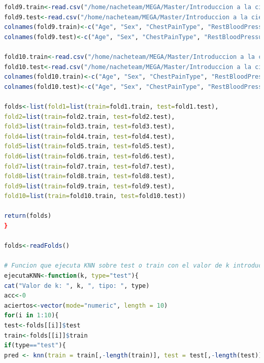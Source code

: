 \documentclass[12pt,a4paper]{article}
\begin{document}
\begin{lstlisting}[basicstyle=\tiny, language=R]
fold9.train<-read.csv("/home/nacheteam/MEGA/Master/Introduccion a la ciencia de datos/Trabajo Integrador/DATOS/Datasets Clasificacion/heart/heart-10-9tra.dat", header=FALSE, comment.char = "@")
fold9.test<-read.csv("/home/nacheteam/MEGA/Master/Introduccion a la ciencia de datos/Trabajo Integrador/DATOS/Datasets Clasificacion/heart/heart-10-9tst.dat", header=FALSE, comment.char = "@")
colnames(fold9.train)<-c("Age", "Sex", "ChestPainType", "RestBloodPressure", "SerumCholestoral", "FastingBloodSugar", "ResElectrocardiographic", "MaxHeartRate", "ExerciseInduced", "Oldpeak", "Slope", "MajorVessels", "Thal", "Class")
colnames(fold9.test)<-c("Age", "Sex", "ChestPainType", "RestBloodPressure", "SerumCholestoral", "FastingBloodSugar", "ResElectrocardiographic", "MaxHeartRate", "ExerciseInduced", "Oldpeak", "Slope", "MajorVessels", "Thal", "Class")

fold10.train<-read.csv("/home/nacheteam/MEGA/Master/Introduccion a la ciencia de datos/Trabajo Integrador/DATOS/Datasets Clasificacion/heart/heart-10-10tra.dat", header=FALSE, comment.char = "@")
fold10.test<-read.csv("/home/nacheteam/MEGA/Master/Introduccion a la ciencia de datos/Trabajo Integrador/DATOS/Datasets Clasificacion/heart/heart-10-10tst.dat", header=FALSE, comment.char = "@")
colnames(fold10.train)<-c("Age", "Sex", "ChestPainType", "RestBloodPressure", "SerumCholestoral", "FastingBloodSugar", "ResElectrocardiographic", "MaxHeartRate", "ExerciseInduced", "Oldpeak", "Slope", "MajorVessels", "Thal", "Class")
colnames(fold10.test)<-c("Age", "Sex", "ChestPainType", "RestBloodPressure", "SerumCholestoral", "FastingBloodSugar", "ResElectrocardiographic", "MaxHeartRate", "ExerciseInduced", "Oldpeak", "Slope", "MajorVessels", "Thal", "Class")

folds<-list(fold1=list(train=fold1.train, test=fold1.test),
fold2=list(train=fold2.train, test=fold2.test),
fold3=list(train=fold3.train, test=fold3.test),
fold4=list(train=fold4.train, test=fold4.test),
fold5=list(train=fold5.train, test=fold5.test),
fold6=list(train=fold6.train, test=fold6.test),
fold7=list(train=fold7.train, test=fold7.test),
fold8=list(train=fold8.train, test=fold8.test),
fold9=list(train=fold9.train, test=fold9.test),
fold10=list(train=fold10.train, test=fold10.test))

return(folds)
}

folds<-readFolds()

# Funcion que ejecuta KNN sobre test o train con el valor de k introducido
ejecutaKNN<-function(k, type="test"){
cat("Valor de k: ", k, ", tipo: ", type)
acc<-0
aciertos<-vector(mode="numeric", length = 10)
for(i in 1:10){
test<-folds[[i]]$test
train<-folds[[i]]$train
if(type=="test"){
pred <- knn(train = train[,-length(train)], test = test[,-length(test)], cl = train[,length(train)], k=k)


\end{lstlisting}
\end{document}
